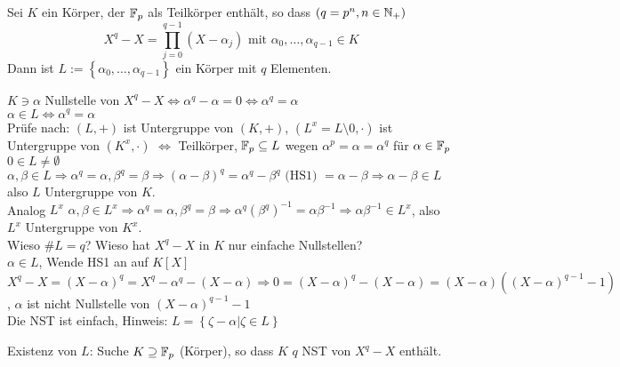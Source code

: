 \documentclass[a4paper,DIV15,BCOR12mm]{article}
\begin{document}
\begin{hilfssatz}[2]
Sei $K$ ein Körper, der $\mathbb{F}_p$ als Teilkörper enthält, so dass $(q=p^n, n\in\mathbb{N}_+)$
$$X^q-X = \prod_{j=0}^{q-1}(X-\alpha_j) \mbox{ mit } \alpha_0,\dotsc,\alpha_{q-1} \in K$$
Dann ist $L:= \left\{\alpha_0,\dotsc,\alpha_{q-1}\right\}$ ein Körper mit $q$ Elementen.
\end{hilfssatz}
\begin{beweis}
$K \ni \alpha$ Nullstelle von $X^q-X \Leftrightarrow \alpha^q-\alpha=0 \Leftrightarrow \alpha^q=\alpha$ \\
$\alpha \in L \Leftrightarrow \alpha^q = \alpha$ \\
Prüfe nach: $(L,+)$ ist Untergruppe von $(K,+)$, $(L^x=L\setminus 0,\cdot)$ ist Untergruppe von $(K^x,\cdot)$ $\Leftrightarrow$ Teilkörper, $\mathbb{F}_p \subseteq L$ wegen $\alpha^p = \alpha = \alpha^q$ für $\alpha \in \mathbb{F}_p$\\
$0 \in L \neq \emptyset$ \\
$\alpha,\beta \in L \Rightarrow \alpha^q = \alpha, \beta^q = \beta \Rightarrow (\alpha-\beta)^q = \alpha^q - \beta^q \mbox{ (HS1) } = \alpha - \beta \Rightarrow \alpha - \beta \in L$ also $L$ Untergruppe von $K$.\\
Analog $L^x$ $\alpha,\beta \in L^x \Rightarrow \alpha^q = \alpha, \beta^q=\beta \Rightarrow \alpha^q(\beta^q)^{-1} = \alpha\beta^{-1} \Rightarrow \alpha\beta^{-1} \in L^x$, also $L^x$ Untergruppe von $K^x$. \\
Wieso $\#L=q$? Wieso hat $X^q-X$ in $K$ nur einfache Nullstellen? \\
$\alpha \in L$, Wende HS1 an auf $K[X]$\\
$X^q-X=(X-\alpha)^q=X^q-\alpha^q-(X-\alpha) \Rightarrow 0 = (X-\alpha)^q - (X-\alpha) = (X-\alpha)\left((X-\alpha)^{q-1}-1\right)$, $\alpha$ ist nicht Nullstelle von $(X-\alpha)^{q-1}-1$ \\
Die NST ist einfach, Hinweis: $L = \left\{\zeta-\alpha|\zeta \in L\right\}$
\end{beweis}

Existenz von $L$: Suche $K \supseteq \mathbb{F}_p$ (Körper), so dass $K$ $q$ NST von $X^q-X$ enthält.
\end{document}
